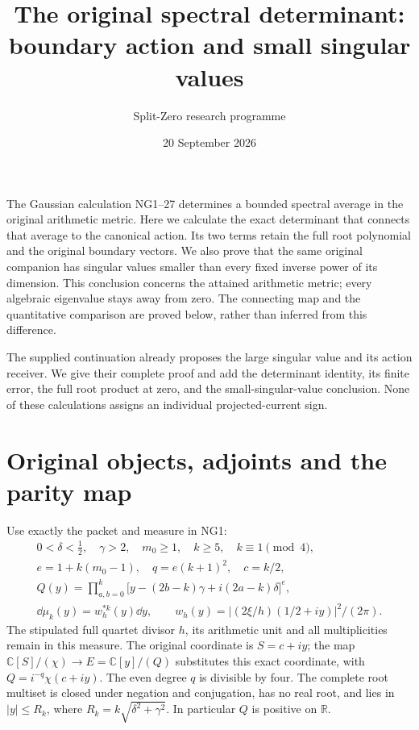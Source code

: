 \documentclass[11pt]{article}
\title{The original spectral determinant:\\boundary action and small singular values}
\author{Split-Zero research programme}\date{20 September 2026}
\newcommand{\R}{\mathbb R}\newcommand{\C}{\mathbb C}
\begin{document}
\maketitle

The Gaussian calculation NG1--27 \cite{NG} determines a bounded spectral
average in the original arithmetic metric. Here we calculate the exact
determinant that connects that average to the canonical action. Its two
terms retain the full root polynomial and the original boundary vectors.
We also prove that the same original companion has singular values smaller
than every fixed inverse power of its dimension. This conclusion concerns
the attained arithmetic metric; every algebraic eigenvalue stays away
from zero. The connecting map and the quantitative comparison are proved
below, rather than inferred from this difference.

The supplied continuation \cite[Section 5]{incoming} already proposes the
large singular value and its action receiver. We give their complete
proof and add the determinant identity, its finite error, the full root
product at zero, and the small-singular-value conclusion. None of these
calculations assigns an individual projected-current sign.

\section{Original objects, adjoints and the parity map}
Use exactly the packet and measure in NG1:
\begin{equation}\tag{SD1}
\begin{gathered}
0<\delta<\tfrac12,\quad\gamma>2,\quad m_0\ge1,\quad
k\ge5,\quad k\equiv1\pmod4,\\
e=1+k(m_0-1),\quad q=e(k+1)^2,\quad c=k/2,\\
Q(y)=\prod_{a,b=0}^k
\bigl[y-(2b-k)\gamma+i(2a-k)\delta\bigr]^e,\\
\dd\mu_k(y)=w_h^{*k}(y)\dd y,\qquad
w_h(y)=|(2\xi/h)(1/2+iy)|^2/(2\pi).
\end{gathered}
\end{equation}
The stipulated full quartet divisor $h$, its arithmetic unit and all
multiplicities remain in this measure. The original coordinate is
$S=c+iy$; the map $\C[S]/(\chi)\to E=\C[y]/(Q)$ substitutes this exact
coordinate, with $Q=i^{-q}\chi(c+iy)$. The even degree $q$ is divisible
by four. The complete root multiset is closed under negation and
conjugation, has no real root, and lies in $|y|\le R_k$, where
$R_k=k\sqrt{\delta^2+\gamma^2}$. In particular $Q$ is positive on $\R$.
\end{document}
